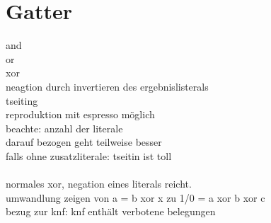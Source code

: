 \section{Gatter}
\label{sec:knf:gatter}


and\\
or\\
xor\\
neagtion durch invertieren des ergebnislisterals
~\\
tseiting\\
reproduktion mit espresso möglich
~\\
beachte: anzahl der literale\\
darauf bezogen geht teilweise besser\\
falls ohne zusatzliterale: tseitin ist toll\\
~\\
normales xor, negation eines literals reicht.\\
umwandlung zeigen von a = b xor x zu 1/0 = a xor b xor c\\
bezug zur knf: knf enthält verbotene belegungen
